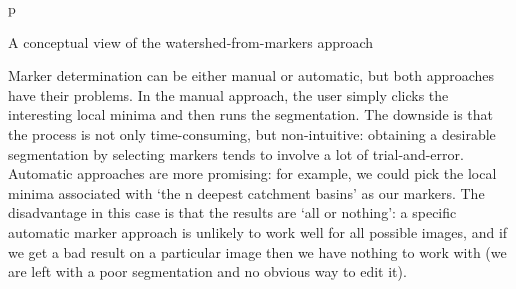 \begin{stusubfig}{p}
	\hspace{4mm}%
	\hspace{4mm}%
\caption{A conceptual view of the watershed-from-markers approach}
\label{fig:segmentation-waterfall-watershedfrommarkers}
\end{stusubfig}

Marker determination can be either manual or automatic, but both approaches have their problems. In the manual approach, the user simply clicks the interesting local minima and then runs the segmentation. The downside is that the process is not only time-consuming, but non-intuitive: obtaining a desirable segmentation by selecting markers tends to involve a lot of trial-and-error. Automatic approaches are more promising: for example, we could pick the local minima associated with `the n deepest catchment basins' as our markers. The disadvantage in this case is that the results are `all or nothing': a specific automatic marker approach is unlikely to work well for all possible images, and if we get a bad result on a particular image then we have nothing to work with (we are left with a poor segmentation and no obvious way to edit it).


